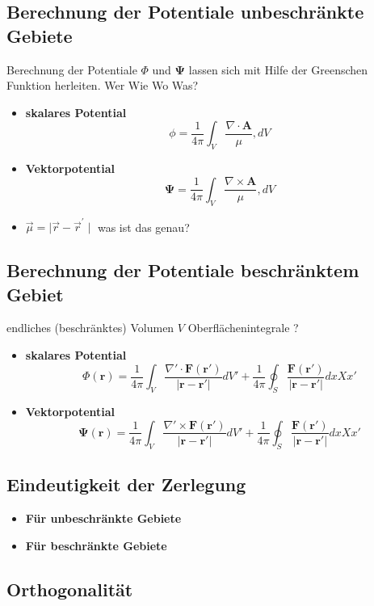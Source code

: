 \subsection{Berechnung der Potentiale unbeschränkte Gebiete
\label{helmholtz:subsection:Berechnung}}


Berechnung der Potentiale $\Phi $ und $\mathbf{\Psi}$ lassen sich mit Hilfe der Greenschen Funktion herleiten. Wer Wie Wo Was?


\begin{itemize}
\item \textbf{skalares Potential}
\begin{equation}
\phi = \frac{1}{4 \pi} \int_{V} \frac{\nabla \cdot \mathbf{A}}{\mu}, dV
\end{equation}
\item \textbf{Vektorpotential}
\begin{equation}
\mathbf{\Psi} = \frac{1}{4 \pi} \int_{V} \frac{\nabla \times \mathbf{A}}{\mu}, dV
\end{equation}
\item $\vec{\mu} = \mid \vec{r} - \vec{r}^{\prime} \mid$ was ist das genau?
\end{itemize}

\subsection{Berechnung der Potentiale beschränktem Gebiet
\label{helmholtz:subsection:BerechnungBeschr}}

endliches (beschränktes) Volumen $V$ Oberflächenintegrale ?

\begin{itemize}
\item \textbf{skalares Potential}
\begin{equation}
\Phi (\mathbf{r}) = \frac{1}{4\pi} \int_V \frac{\nabla' \cdot \mathbf{F}(\mathbf{r}')}{|\mathbf{r} - \mathbf{r}'|} dV' + \frac{1}{4\pi} \oint_S \frac{\mathbf{F}(\mathbf{r}')}{|\mathbf{r} - \mathbf{r}'|} dxXx'
\end{equation}
\item \textbf{Vektorpotential}
\begin{equation}
\mathbf{\Psi}(\mathbf{r}) = \frac{1}{4\pi} \int_V \frac{\nabla' \times \mathbf{F}(\mathbf{r}')}{|\mathbf{r} - \mathbf{r}'|} dV' + \frac{1}{4\pi} \oint_S \frac{\mathbf{F}(\mathbf{r}')}{|\mathbf{r} - \mathbf{r}'|} dxXx'
\end{equation}
\end{itemize}


\subsection{Eindeutigkeit der Zerlegung 
\label{helmholtz:subsection:EindeutigkeitS}}

\begin{itemize}
\item \textbf{Für unbeschränkte Gebiete}
\item \textbf{Für beschränkte Gebiete}
\end{itemize}


\subsection{Orthogonalität
\label{helmholtz:subsection:Orthogonalitaet}}


